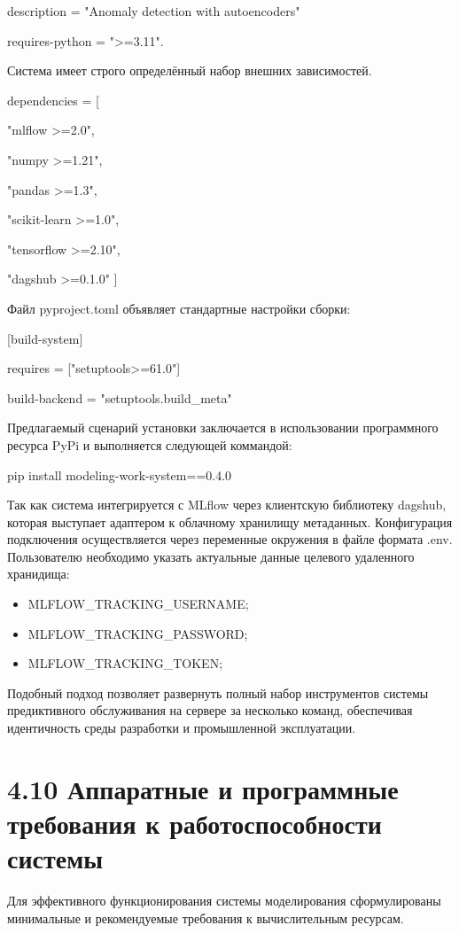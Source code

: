 \documentclass[14pt, a4paper, oneside]{extreport}
\begin{document}
description = "Anomaly detection with autoencoders"

requires-python = ">=3.11".

Система имеет строго определённый набор внешних зависимостей.

dependencies = [
    
"mlflow >=2.0",

"numpy >=1.21",

"pandas >=1.3",

"scikit-learn >=1.0",

"tensorflow >=2.10",

"dagshub >=0.1.0"
]

Файл pyproject.toml объявляет стандартные настройки сборки:

[build-system]

requires = ["setuptools>=61.0"]

build-backend = "setuptools.build\_meta"

Предлагаемый сценарий установки заключается в использовании программного ресурса PyPi и выполняется следующей коммандой:

pip install modeling-work-system==0.4.0

Так как система интегрируется с MLflow через клиентскую библиотеку dagshub, которая выступает адаптером к облачному хранилищу метаданных. Конфигурация подключения осуществляется через переменные окружения в файле формата .env. Пользователю необходимо указать актуальные данные целевого удаленного хранидища:
\begin{itemize}
    \item MLFLOW\_TRACKING\_USERNAME;
    \item MLFLOW\_TRACKING\_PASSWORD;
    \item MLFLOW\_TRACKING\_TOKEN;
\end{itemize}

Подобный подход позволяет развернуть полный набор инструментов системы предиктивного обслуживания на сервере за несколько команд, обеспечивая идентичность среды разработки и промышленной эксплуатации.

\vspace{1em}
\section{4.10 Аппаратные и программные требования к работоспособности системы}
\vspace{1em}

Для эффективного функционирования системы моделирования сформулированы минимальные и рекомендуемые требования к вычислительным ресурсам.
\end{document}
